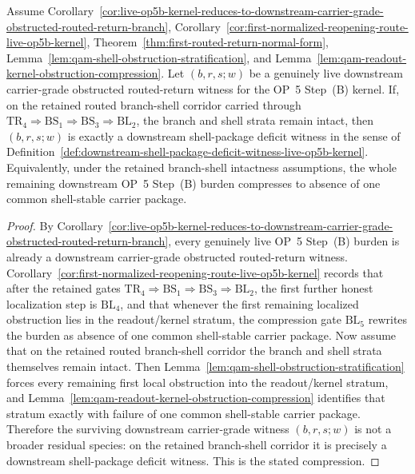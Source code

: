 \begin{proposition}
\label{prop:downstream-carrier-grade-op5-witnesses-compress-to-one-common-shell-stable-carrier-package-deficit}
Assume Corollary~\ref{cor:live-op5b-kernel-reduces-to-downstream-carrier-grade-obstructed-routed-return-branch}, Corollary~\ref{cor:first-normalized-reopening-route-live-op5b-kernel}, Theorem~\ref{thm:first-routed-return-normal-form}, Lemma~\ref{lem:qam-shell-obstruction-stratification}, and Lemma~\ref{lem:qam-readout-kernel-obstruction-compression}. Let $(b,r,s;w)$ be a genuinely live downstream carrier-grade obstructed routed-return witness for the OP~5 Step~(B) kernel. If, on the retained routed branch-shell corridor carried through \(\mathrm{TR}_4\Rightarrow\mathrm{BS}_1\Rightarrow\mathrm{BS}_3\Rightarrow\mathrm{BL}_2\), the branch and shell strata remain intact, then $(b,r,s;w)$ is exactly a downstream shell-package deficit witness in the sense of Definition~\ref{def:downstream-shell-package-deficit-witness-live-op5b-kernel}. Equivalently, under the retained branch-shell intactness assumptions, the whole remaining downstream OP~5 Step~(B) burden compresses to absence of one common shell-stable carrier package.
\end{proposition}

\begin{proof}
By Corollary~\ref{cor:live-op5b-kernel-reduces-to-downstream-carrier-grade-obstructed-routed-return-branch}, every genuinely live OP~5 Step~(B) burden is already a downstream carrier-grade obstructed routed-return witness. Corollary~\ref{cor:first-normalized-reopening-route-live-op5b-kernel} records that after the retained gates \(\mathrm{TR}_4\Rightarrow\mathrm{BS}_1\Rightarrow\mathrm{BS}_3\Rightarrow\mathrm{BL}_2\), the first further honest localization step is \(\mathrm{BL}_4\), and that whenever the first remaining localized obstruction lies in the readout/kernel stratum, the compression gate \(\mathrm{BL}_5\) rewrites the burden as absence of one common shell-stable carrier package. Now assume that on the retained routed branch-shell corridor the branch and shell strata themselves remain intact. Then Lemma~\ref{lem:qam-shell-obstruction-stratification} forces every remaining first local obstruction into the readout/kernel stratum, and Lemma~\ref{lem:qam-readout-kernel-obstruction-compression} identifies that stratum exactly with failure of one common shell-stable carrier package. Therefore the surviving downstream carrier-grade witness $(b,r,s;w)$ is not a broader residual species: on the retained branch-shell corridor it is precisely a downstream shell-package deficit witness. This is the stated compression.
\end{proof}

